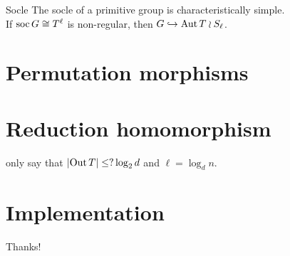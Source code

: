 \documentclass{beamer}
\theoremstyle{plain}
\theoremstyle{definition}
\begin{document}

\begin{frame}{Socle}
The socle of a primitive group is characteristically simple.
\\[2em]
If $\operatorname{soc} G \cong T ^ \ell$ is non-regular, then
$G \hookrightarrow \operatorname{Aut} T \wr S_\ell$.
\end{frame}

\section{Permutation morphisms}

\section{Reduction homomorphism}
\begin{frame}
only say that
$ \left| \operatorname{Out} T \right|  \leq ? \log_2 d$
and
$\ell = \log_d n$.
\end{frame}

\section{Implementation}

\begin{frame}[standout]
Thanks!
\end{frame}

\printbibliography
\appendix
\end{document}
